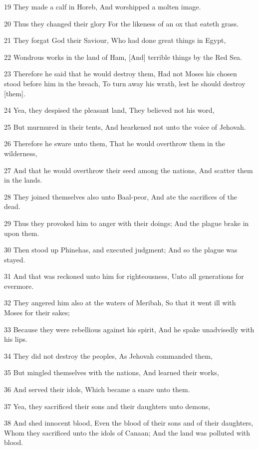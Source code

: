 \par 19 They made a calf in Horeb, And worshipped a molten image.
\par 20 Thus they changed their glory For the likeness of an ox that eateth grass.
\par 21 They forgat God their Saviour, Who had done great things in Egypt,
\par 22 Wondrous works in the land of Ham, [And] terrible things by the Red Sea.
\par 23 Therefore he said that he would destroy them, Had not Moses his chosen stood before him in the breach, To turn away his wrath, lest he should destroy [them].
\par 24 Yea, they despised the pleasant land, They believed not his word,
\par 25 But murmured in their tents, And hearkened not unto the voice of Jehovah.
\par 26 Therefore he sware unto them, That he would overthrow them in the wilderness,
\par 27 And that he would overthrow their seed among the nations, And scatter them in the lands.
\par 28 They joined themselves also unto Baal-peor, And ate the sacrifices of the dead.
\par 29 Thus they provoked him to anger with their doings; And the plague brake in upon them.
\par 30 Then stood up Phinehas, and executed judgment; And so the plague was stayed.
\par 31 And that was reckoned unto him for righteousness, Unto all generations for evermore.
\par 32 They angered him also at the waters of Meribah, So that it went ill with Moses for their sakes;
\par 33 Because they were rebellious against his spirit, And he spake unadvisedly with his lips.
\par 34 They did not destroy the peoples, As Jehovah commanded them,
\par 35 But mingled themselves with the nations, And learned their works,
\par 36 And served their idols, Which became a snare unto them.
\par 37 Yea, they sacrificed their sons and their daughters unto demons,
\par 38 And shed innocent blood, Even the blood of their sons and of their daughters, Whom they sacrificed unto the idols of Canaan; And the land was polluted with blood.
